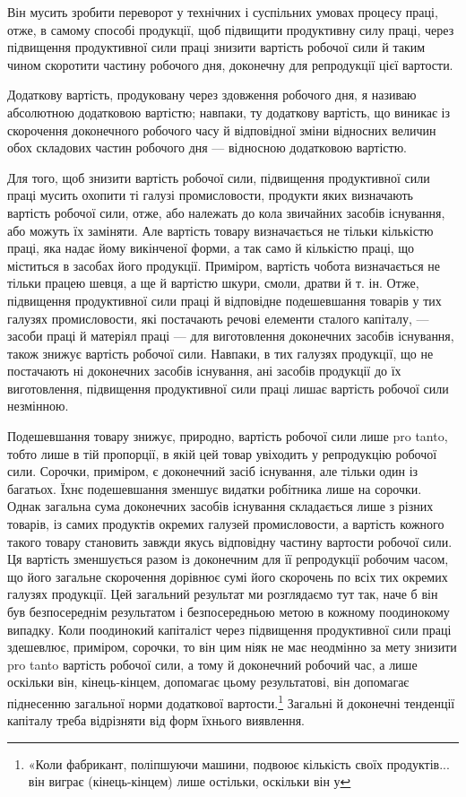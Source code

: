 \parcont{}  %
Він мусить зробити переворот у технічних і суспільних умовах
процесу праці, отже, в самому способі продукції, щоб підвищити
продуктивну силу праці, через підвищення продуктивної сили
праці знизити вартість робочої сили й таким чином скоротити
частину робочого дня, доконечну для репродукції цієї вартости.

Додаткову вартість, продуковану через здовження робочого
дня, я називаю абсолютною додатковою вартістю; навпаки, ту
додаткову вартість, що виникає із скорочення доконечного робочого
часу й відповідної зміни відносних величин обох складових
частин робочого дня — відносною додатковою вартістю.

Для того, щоб знизити вартість робочої сили, підвищення
продуктивної сили праці мусить охопити ті галузі промисловости,
продукти яких визначають вартість робочої сили, отже, або
належать до кола звичайних засобів існування, або можуть їх
заміняти. Але вартість товару визначається не тільки кількістю
праці, яка надає йому викінченої форми, а так само й кількістю
праці, що міститься в засобах його продукції. Приміром, вартість
чобота визначається не тільки працею шевця, а ще й вартістю
шкури, смоли, дратви й т. ін. Отже, підвищення продуктивної
сили праці й відповідне подешевшання товарів у тих галузях
промисловости, які постачають речові елементи сталого капіталу, —
засоби праці й матеріял праці — для виготовлення доконечних
засобів існування, також знижує вартість робочої сили. Навпаки,
в тих галузях продукції, що не постачають ні доконечних засобів
існування, ані засобів продукції до їх виготовлення, підвищення
продуктивної сили праці лишає вартість робочої сили незмінною.

Подешевшання товару знижує, природно, вартість робочої
сили лише pro tanto, тобто лише в тій пропорції, в якій цей товар
увіходить у репродукцію робочої сили. Сорочки, приміром, є
доконечний засіб існування, але тільки один із багатьох. Їхнє
подешевшання зменшує видатки робітника лише на сорочки.
Однак загальна сума доконечних засобів існування складається
лише з різних товарів, із самих продуктів окремих галузей
промисловости, а вартість кожного такого товару становить завжди
якусь відповідну частину вартости робочої сили. Ця вартість
зменшується разом із доконечним для її репродукції робочим
часом, що його загальне скорочення дорівнює сумі його скорочень
по всіх тих окремих галузях продукції. Цей загальний результат
ми розглядаємо тут так, наче б він був безпосереднім результатом
і безпосередньою метою в кожному поодинокому випадку. Коли
поодинокий капіталіст через підвищення продуктивної сили праці
здешевлює, приміром, сорочки, то він цим ніяк не має неодмінно за
мету знизити pro tanto вартість робочої сили, а тому й доконечний
робочий час, а лише оскільки він, кінець-кінцем, допомагає
цьому результатові, він допомагає піднесенню загальної норми
додаткової вартости.\footnote{
«Коли фабрикант, поліпшуючи машини, подвоює кількість своїх
продуктів... він виграє (кінець-кінцем) лише остільки, оскільки він у
} Загальні й доконечні тенденції капіталу
треба відрізняти від форм їхнього виявлення.

